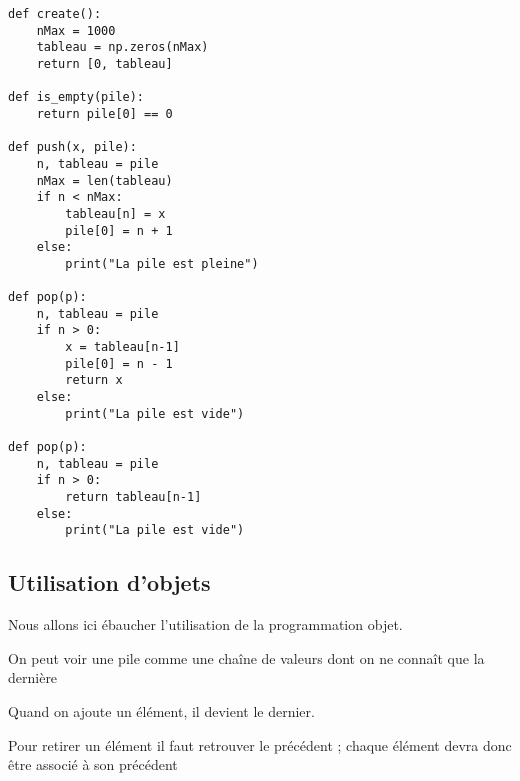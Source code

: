 \begin{lstlisting}[caption = {Fonctions de piles avec un tableau}]
def create():
    nMax = 1000
    tableau = np.zeros(nMax)
    return [0, tableau]
    
def is_empty(pile):
    return pile[0] == 0
    
def push(x, pile):
    n, tableau = pile
    nMax = len(tableau)
    if n < nMax:
        tableau[n] = x
        pile[0] = n + 1
    else:
        print("La pile est pleine")
    
def pop(p):
    n, tableau = pile
    if n > 0:
        x = tableau[n-1]
        pile[0] = n - 1
        return x
    else:
        print("La pile est vide")
        
def pop(p):
    n, tableau = pile
    if n > 0:
        return tableau[n-1]
    else:
        print("La pile est vide")
\end{lstlisting}
\newpage
\subsection{Utilisation d'objets}
Nous allons ici ébaucher l'utilisation de la programmation objet.

\medskip

On peut voir une pile comme une chaîne de valeurs dont on ne connaît que la dernière

\begin{center}
\end{center}
Quand on ajoute un élément, il devient le dernier. 

Pour retirer un élément il faut retrouver le précédent ; chaque élément devra donc être associé à son précédent

